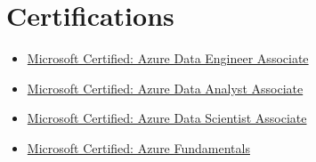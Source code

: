 
\section{Certifications}

\begin{itemize}
	\item \href{https://www.credly.com/badges/6b30cb69-ac54-4abc-b26d-61deef5c2a4c/public_url}{Microsoft Certified: Azure Data Engineer Associate}
	\item \href{https://www.credly.com/badges/36381c2d-87cc-445b-a174-b1431604a0f5/public_url}{Microsoft Certified: Azure Data Analyst Associate}
	\item \href{https://www.credly.com/badges/209afd56-075a-42e3-9ce8-88c8bc05aae5/public_url}{Microsoft Certified: Azure Data Scientist Associate}
	\item \href{https://www.credly.com/badges/1d886867-8f7b-45d5-b2ee-5416127e3d36/public_url}{Microsoft Certified: Azure Fundamentals}
\end{itemize}